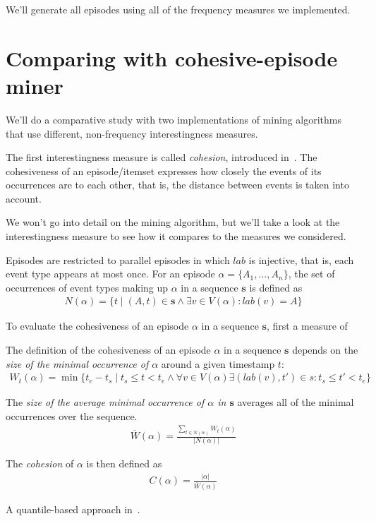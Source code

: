 We'll generate all episodes using all of the frequency measures we implemented.

\section{Comparing with cohesive-episode miner}


We'll do a comparative study with two implementations of mining algorithms that use different, non-frequency interestingness measures.

The first interestingness measure is called \emph{cohesion}, introduced in~\citep{cule2016efficient}. The cohesiveness of an episode/itemset expresses how closely the events of its occurrences are to each other, that is, the distance between events is taken into account.

We won't go into detail on the mining algorithm, but we'll take a look at the interestingness measure to see how it compares to the measures we considered.

Episodes are restricted to parallel episodes in which $ lab $ is injective, that is, each event type appears at most once. For an episode $ \alpha = \{ A_1, \ldots, A_n \} $, the set of occurrences of event types making up $ \alpha $ in a sequence $ \boldsymbol{s} $ is defined as
\begin{align*}
N(\alpha) = \{ t \mid (A, t) \in \boldsymbol{s} \wedge \exists v \in V(\alpha): lab(v) = A \}
\end{align*}


To evaluate the cohesiveness of an episode $ \alpha $ in a sequence $ \boldsymbol{s} $, first a measure of 

The definition of the cohesiveness of an episode $ \alpha $ in a sequence $ \boldsymbol{s} $ depends on the \emph{size of the minimal occurrence of $ \alpha $} around a given timestamp $ t $:
\begin{align*}
W_t(\alpha) = \min\{ t_e - t_s \mid t_s \leq t < t_e \wedge \forall v \in V(\alpha) \exists (lab(v), t') \in s : t_s \leq t' < t_e \}
\end{align*}

The \emph{size of the average minimal occurrence of $ \alpha $ in $ \boldsymbol{s} $} averages all of the minimal occurrences over the sequence.
\begin{align*}
\overline{W}(\alpha) = \frac{\sum_{t \in N(\alpha)} W_t(\alpha)}{| N(\alpha) |}
\end{align*}

The \emph{cohesion} of $ \alpha $ is then defined as
\begin{align*}
C(\alpha) = \frac{| \alpha |}{\overline{W}(\alpha)}
\end{align*}

A quantile-based approach in~\citep{feremans2018mining}.

